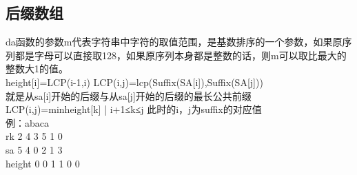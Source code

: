 \subsection{后缀数组}
da函数的参数m代表字符串中字符的取值范围，是基数排序的一个参数，如果原序列都是字母可以直接取128，如果原序列本身都是整数的话，则m可以取比最大的整数大1的值。\\
height[i]=LCP(i-1,i) LCP(i,j)=lcp(Suffix(SA[i]),Suffix(SA[j])) \\
						   就是从sa[i]开始的后缀与从sa[j]开始的后缀的最长公共前缀 \\
						   LCP(i,j)=min{height[k] | i+1≤k≤j}  此时的i，j为suffix的对应值\\
						   例：abaca \\
						   rk 2 4 3 5 1 0\\
						   sa 5 4 0 2 1 3\\
						   height 0 0 1 1 0 0\\

